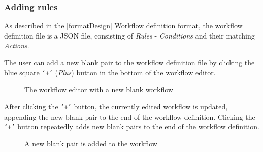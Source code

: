 \subsubsection{Adding rules}
As described in the \autoref{formatDesign} Workflow definition format, the workflow definition file is a JSON file,
consisting of \textit{Rules} - \textit{Conditions} and their matching \textit{Actions}.

The user can add a new blank pair to the workflow definition file by clicking the blue square \texttt{`+'} (\textit{Plus}) button
in the bottom of the workflow editor.

\begin{figure}[!h]
    \begin{center}
    \end{center}
    \caption{The workflow editor with a new blank workflow}
\end{figure}

After clicking the \texttt{`+'} button, the currently edited workflow is updated,
appending the new blank pair to the end of the workflow definition. 
Clicking the \texttt{`+'} button repeatedly adds new blank pairs to the end of the workflow definition.

\begin{figure}[!h]
    \begin{center}
    \end{center}
    \caption{A new blank pair is added to the workflow}
\end{figure}

